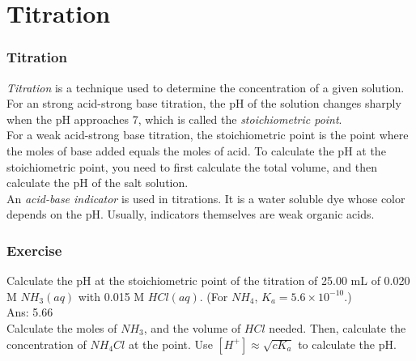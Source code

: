 \documentclass[aspectratio=169]{beamer}
\def\blankline{\\[12pt]}
\begin{document}
\section{Titration}
\begin{frame}
  \frametitle{Titration}
  \textit{Titration} is a technique used to determine the concentration of a given solution. 
  For an strong acid-strong base titration, the pH of the solution changes sharply when the pH approaches 7, which is called
  the \textit{stoichiometric point}. 
  \blankline
  For a weak acid-strong base titration, the stoichiometric point is the point where the moles of base added equals the moles of acid.
  To calculate the pH at the stoichiometric point, you need to first calculate the total volume, and then calculate the pH of the salt 
  solution.
  \blankline
  An \textit{acid-base indicator} is used in titrations. It is a water soluble dye whose color depends on the pH. Usually, indicators themselves
  are weak organic acids. 
\end{frame}
\begin{frame}
  \frametitle{Exercise}
  Calculate the pH at the stoichiometric point of the titration of 25.00 mL of 0.020 M $NH_3(aq)$ with 0.015 M $HCl(aq)$. (For $NH_4$, 
  $K_a = 5.6\times 10^{-10}$.)
  \pause
  \blankline
  Ans: 5.66 \\
  Calculate the moles of $NH_3$, and the volume of $HCl$ needed. Then, calculate the concentration of $NH_4Cl$ at the point. Use $[H^+] \approx \sqrt{cK_a}$ to
  calculate the pH.
\end{frame}
\end{document}
